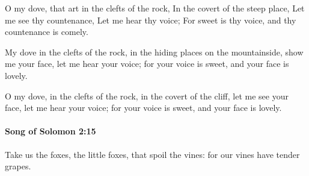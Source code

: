 			\begin{versebox}
					\item[BHS] 
					\item[LXX] 
					\item[ASV] O my dove, that art in the clefts of the rock, In the covert of the steep place, Let me see thy countenance, Let me hear thy voice; For sweet is thy voice, and thy countenance is comely.
					\item[NIV] My dove in the clefts of the rock, in the hiding places on the mountainside, show me your face, let me hear your voice; for your voice is sweet, and your face is lovely.
					\item[NRSV] O my dove, in the clefts of the rock, in the covert of the cliff, let me see your face, let me hear your voice; for your voice is sweet, and your face is lovely.
			\end{versebox}

		\paragraph{Song of Solomon 2:15} %
			\label{SONGOFSOLOMON-2-15}

			Take us the foxes, the little foxes, that spoil the vines: for our vines have tender grapes.


